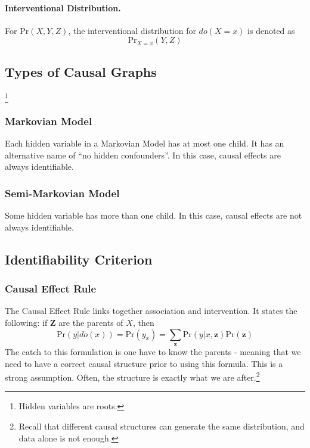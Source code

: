 \documentclass[11pt]{article}
\newcommand{\bz}{\mathbf{z}}
\newcommand{\pr}{\mathrm{Pr}}
\begin{document}
\paragraph{Interventional Distribution.} For $\pr (X, Y, Z)$, the interventional distribution for $do(X = x)$ is denoted as 
\begin{equation}
	\pr _{X = x} (Y, Z)
\end{equation}


\subsection{Types of Causal Graphs}\footnote{Hidden variables are roots.}
\subsubsection{Markovian Model}
Each hidden variable in a Markovian Model has at most one child. It has an alternative name of ``no hidden confounders''. In this case, causal effects are always identifiable. 

\subsubsection{Semi-Markovian Model}
Some hidden variable has more than one child. In this case, causal effects are not always identifiable. 

\subsection{Identifiability Criterion}
\subsubsection{Causal Effect Rule}
The Causal Effect Rule links together association and intervention. It states the following: if $\mathbf Z$ are the parents of $X$, then
\begin{equation}
	\pr (y | do(x)) = \pr(y_x) = \sum_{\mathbf z} \pr (y | x, \bz ) \pr (\bz)
\end{equation}
The catch to this formulation is one have to know the parents - meaning that we need to have a correct causal structure prior to using this formula. This is a strong assumption. Often, the structure is exactly what we are after.\footnote{
Recall that different causal structures can generate the same distribution, and data alone is not enough.
} 
\end{document}
